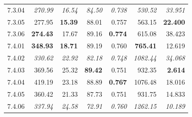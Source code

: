 \begin{table}[!t]
\begin{tabular}{@{}lrrrrrr@{}}
    7.3.04 & \textit{270.99} & \textit{16.54} & \textit{84.50} & \textit{0.738} & \textit{530.52} & \textit{33.951} \\
    7.3.05 & 277.95 & \textbf{15.39} & 88.01 & 0.757 & 563.15 & \textbf{22.400} \\
    7.3.06 & \textbf{274.43} & 17.67 & 89.16 & \textbf{0.774} & 615.08 & 38.423 \\
    \noalign{\smallskip}
    7.4.01 & \textbf{348.93} & \textbf{18.71} & 89.19 & 0.760 & \textbf{765.41} & 12.619 \\
    7.4.02 & \textit{330.62} & \textit{22.92} & \textit{82.18} & \textit{0.748} & \textit{1082.44} & \textit{34.068} \\
    7.4.03 & 369.56 & 25.32 & \textbf{89.42} & 0.751 & 932.35 & \textbf{2.614} \\
    7.4.04 & 419.19 & 23.18 & 88.89 & \textbf{0.767} & 1076.48 & 18.016 \\
    7.4.05 & 360.42 & 21.33 & 87.73 & 0.751 & 931.75 & 14.833 \\
    7.4.06 & \textit{337.94} & \textit{24.58} & \textit{72.91} & \textit{0.760} & \textit{1262.15} & \textit{10.189} \\
\hline
\end{tabular}
\end{table}